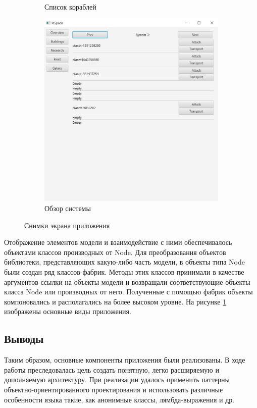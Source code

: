 \begin{figure}[H]
\begin{subfigure}[b]{0.4\textwidth}
\caption{Список кораблей}
\end{subfigure}
\begin{subfigure}[b]{0.4\textwidth} 
\includegraphics[width=1\textwidth]{../screenshots/5.png}
\caption{Обзор системы}
\end{subfigure}
\caption{Снимки экрана приложения}
\label{pic:gui}
\end{figure} 

Отображение элементов модели и взаимодействие с ними обеспечивалось объектами классов производных от Node. Для преобразования объектов библиотеки, представляющих какую-либо часть модели, в объекты типа Node были создан ряд классов-фабрик. Методы этих классов принимали в качестве аргументов ссылки на объекты модели и возвращали соответствующие объекты класса Node или производных от него. Полученные с помощью фабрик объекты компоновались и располагались на более высоком уровне. На рисунке \ref{pic:gui} изображены основные виды приложения.


  

\subsection{Выводы}
Таким образом, основные компоненты приложения были реализованы. В ходе работы преследовалась цель создать понятную, легко расширяемую и дополняемую архитектуру. При реализации удалось применить паттерны объектно-ориентированного проектирования и использовать различные особенности языка такие, как анонимные классы, лямбда-выражения и др. 
   
